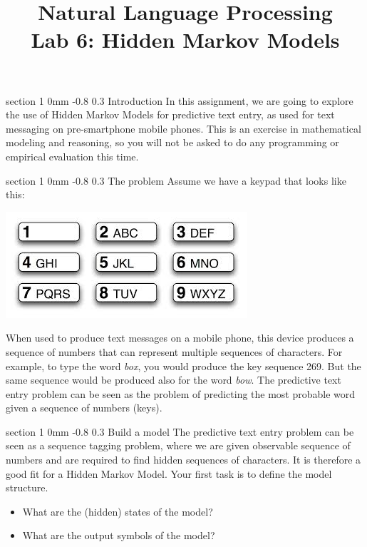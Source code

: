 \documentclass[11pt]{article}
\title{{\LARGE Natural Language Processing}\\[1.5mm]{\large Lab 6: Hidden Markov Models}}
\author{}
\date{} %
\makeatletter
\newcommand{\newsec}[2]{\section{#1}\label{sec:#2}\noindent}
\renewcommand{\section}{\@startsection
{section}%
{1}%
{0mm}%
{-0.8\baselineskip}%
{0.3\baselineskip}%
{\bfseries\large}}%
\makeatother
\begin{document}
 

\maketitle
\vspace{-2mm} \newsec{Introduction}{intro}%
In this assignment, we are going to explore the use of Hidden Markov
Models for predictive text entry, as used for text messaging on
pre-smartphone mobile phones.  This is an exercise in mathematical
modeling and reasoning, so you will not be asked to do any programming
or empirical evaluation this time.

\newsec{The problem}{problem}%
Assume we have a keypad that looks like this:
\begin{center}
\includegraphics[scale=0.5]{keypad.jpeg}
\end{center}
When used to produce text messages on a mobile phone, this device
produces a sequence of numbers that can represent multiple sequences
of characters.  For example, to type the word {\em box}, you would
produce the key sequence 269. But the same sequence would be produced
also for the word {\em bow}.  The predictive text entry problem can be
seen as the problem of predicting the most probable word given a
sequence of numbers (keys).

\newsec{Build a model}{model}%
The predictive text entry problem can be seen as a sequence tagging
problem, where we are given observable sequence of numbers and are
required to find hidden sequences of characters. It is therefore a
good fit for a Hidden Markov Model. Your first task is to define the
model structure.
\begin{itemize}[noitemsep,topsep=0.2cm]
\item What are the (hidden) states of the model?
\item What are the output symbols of the model?
\end{itemize}
\end{document}
